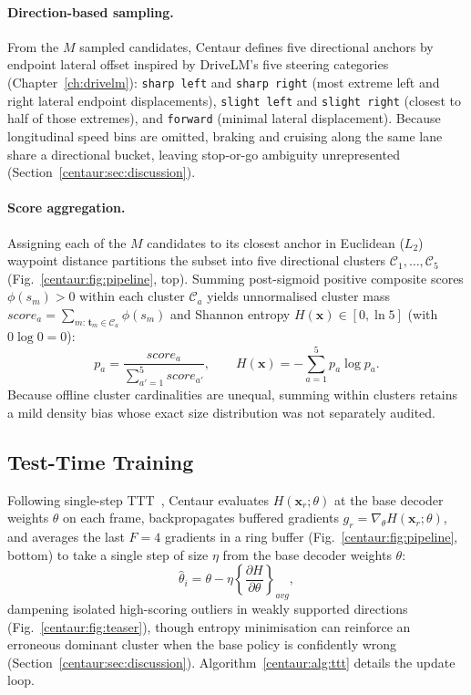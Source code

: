 \paragraph{Direction-based sampling.} From the $M$ sampled candidates, Centaur defines five directional anchors by endpoint lateral offset inspired by DriveLM's five steering categories~\cite{sima2024drivelm} (Chapter~\ref{ch:drivelm}): \texttt{sharp left} and \texttt{sharp right} (most extreme left and right lateral endpoint displacements), \texttt{slight left} and \texttt{slight right} (closest to half of those extremes), and \texttt{forward} (minimal lateral displacement). Because longitudinal speed bins are omitted, braking and cruising along the same lane share a directional bucket, leaving stop-or-go ambiguity unrepresented (Section~\ref{centaur:sec:discussion}).

\paragraph{Score aggregation.} Assigning each of the $M$ candidates to its closest anchor in Euclidean ($L_2$) waypoint distance partitions the subset into five directional clusters $\mathcal{C}_1, \dots, \mathcal{C}_5$ (Fig.~\ref{centaur:fig:pipeline}, top). Summing post-sigmoid positive composite scores $\phi(s_m) > 0$ within each cluster $\mathcal{C}_a$ yields unnormalised cluster mass $\mathit{score}_a = \sum_{m:\,\mathbf{t}_m \in \mathcal{C}_a} \phi(s_m)$ and Shannon entropy $H(\mathbf{x}) \in [0, \ln 5]$ (with $0\log 0 = 0$):
\begin{equation}
  \label{centaur:eq:ce}
  p_a = \frac{\mathit{score}_a}{\sum_{a'=1}^{5} \mathit{score}_{a'}}, \qquad
  H(\mathbf{x}) = -\sum_{a=1}^{5} p_a \log p_a.
\end{equation}
Because offline cluster cardinalities are unequal, summing within clusters retains a mild density bias whose exact size distribution was not separately audited.

\subsection{Test-Time Training}\label{centaur:sec:ttt}

Following single-step TTT~\cite{Gao2024fstta}, Centaur evaluates $H(\mathbf{x}_r;\theta)$ at the base decoder weights $\theta$ on each frame, backpropagates buffered gradients $g_r = \nabla_\theta H(\mathbf{x}_r;\theta)$, and averages the last $F=4$ gradients in a ring buffer (Fig.~\ref{centaur:fig:pipeline}, bottom) to take a single step of size $\eta$ from the base decoder weights $\theta$:
\begin{equation}
  \label{centaur:eq:ttt}
  \hat{\theta}_i = \theta - \eta \left\{\frac{\partial H}{\partial \theta}\right\}_{avg},
\end{equation}
dampening isolated high-scoring outliers in weakly supported directions (Fig.~\ref{centaur:fig:teaser}), though entropy minimisation can reinforce an erroneous dominant cluster when the base policy is confidently wrong (Section~\ref{centaur:sec:discussion}). Algorithm~\ref{centaur:alg:ttt} details the update loop.


